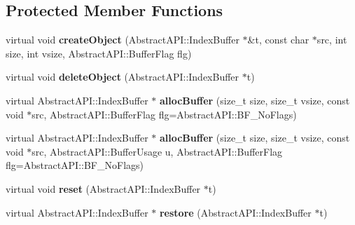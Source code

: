 \subsection*{Protected Member Functions}
\begin{DoxyCompactItemize}
\item 
\hypertarget{class_tempest_1_1_index_buffer_holder_a04358f769c214ff88e17d15ef7ec6126}{virtual void {\bfseries create\+Object} (Abstract\+A\+P\+I\+::\+Index\+Buffer $\ast$\&t, const char $\ast$src, int size, int vsize, Abstract\+A\+P\+I\+::\+Buffer\+Flag flg)}\label{class_tempest_1_1_index_buffer_holder_a04358f769c214ff88e17d15ef7ec6126}

\item 
\hypertarget{class_tempest_1_1_index_buffer_holder_a60f3221d9d2290d96b6d8a01c5cf7425}{virtual void {\bfseries delete\+Object} (Abstract\+A\+P\+I\+::\+Index\+Buffer $\ast$t)}\label{class_tempest_1_1_index_buffer_holder_a60f3221d9d2290d96b6d8a01c5cf7425}

\item 
\hypertarget{class_tempest_1_1_index_buffer_holder_a0237328b430e24d22578c233f4e3c3ed}{virtual Abstract\+A\+P\+I\+::\+Index\+Buffer $\ast$ {\bfseries alloc\+Buffer} (size\+\_\+t size, size\+\_\+t vsize, const void $\ast$src, Abstract\+A\+P\+I\+::\+Buffer\+Flag flg=Abstract\+A\+P\+I\+::\+B\+F\+\_\+\+No\+Flags)}\label{class_tempest_1_1_index_buffer_holder_a0237328b430e24d22578c233f4e3c3ed}

\item 
\hypertarget{class_tempest_1_1_index_buffer_holder_a2258b8b0787ef97f864c2e7af2f224b5}{virtual Abstract\+A\+P\+I\+::\+Index\+Buffer $\ast$ {\bfseries alloc\+Buffer} (size\+\_\+t size, size\+\_\+t vsize, const void $\ast$src, Abstract\+A\+P\+I\+::\+Buffer\+Usage u, Abstract\+A\+P\+I\+::\+Buffer\+Flag flg=Abstract\+A\+P\+I\+::\+B\+F\+\_\+\+No\+Flags)}\label{class_tempest_1_1_index_buffer_holder_a2258b8b0787ef97f864c2e7af2f224b5}

\item 
\hypertarget{class_tempest_1_1_index_buffer_holder_a0fb8a559f63193f30f3ee196de58884f}{virtual void {\bfseries reset} (Abstract\+A\+P\+I\+::\+Index\+Buffer $\ast$t)}\label{class_tempest_1_1_index_buffer_holder_a0fb8a559f63193f30f3ee196de58884f}

\item 
\hypertarget{class_tempest_1_1_index_buffer_holder_a85dba0dd86d7c85725df7365d99147fb}{virtual Abstract\+A\+P\+I\+::\+Index\+Buffer $\ast$ {\bfseries restore} (Abstract\+A\+P\+I\+::\+Index\+Buffer $\ast$t)}\label{class_tempest_1_1_index_buffer_holder_a85dba0dd86d7c85725df7365d99147fb}


\end{DoxyCompactItemize}
